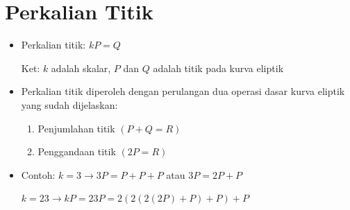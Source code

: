 \documentclass{article}
\begin{document}

\section*{Perkalian Titik}

\begin{itemize}
    \item Perkalian titik: \(kP = Q\)
    
    Ket: \(k\) adalah skalar, \(P\) dan \(Q\) adalah titik pada kurva eliptik
    
    \item Perkalian titik diperoleh dengan perulangan dua operasi dasar kurva eliptik yang sudah dijelaskan:
    \begin{enumerate}
        \item Penjumlahan titik \((P + Q = R)\)
        \item Penggandaan titik \((2P = R)\)
    \end{enumerate}
    
    \item Contoh: \(k = 3 \rightarrow 3P = P + P + P\) atau \(3P = 2P + P\)
    
    \(k = 23 \rightarrow kP = 23P = 2(2(2(2P) + P) + P) + P\)
\end{itemize}
\end{document}
